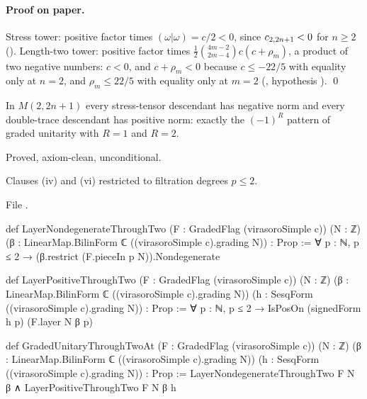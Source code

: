 \paragraph{Proof on paper.} Stress tower: positive factor times $(\omega|\omega) = c/2<0$, since
$c_{2,2n+1}<0$ for $n\ge2$ (\allowbreak{}). Length-two tower: positive factor
times $\tfrac12\binom{4m-2}{2m-4}c(c+\rho_m)$, a product of two negative numbers: $c<0$, and
$c+\rho_m<0$ because $c\le-22/5$ with equality only at $n=2$, and $\rho_m\le22/5$ with equality only at
$m=2$ (\allowbreak{}, hypothesis ). \qed

\begin{physics}
In $M(2,2n+1)$ every stress-tensor descendant has negative norm and every double-trace descendant has
positive norm: exactly the $(-1)^R$ pattern of graded unitarity with $R = 1$ and $R=2$.
\end{physics}

\begin{status}
Proved, axiom-clean, unconditional.
\end{status}

\begin{definition}\label{l19:def:throughtwo}
Clauses (iv) and (vi) restricted to filtration degrees $p\le2$.
\end{definition}

\noindent File .
\begin{leancode}
def LayerNondegenerateThroughTwo (F : GradedFlag (virasoroSimple c)) (N : ℤ)
    (β : LinearMap.BilinForm ℂ ((virasoroSimple c).grading N)) : Prop :=
  ∀ p : ℕ, p ≤ 2 → (β.restrict (F.pieceIn p N)).Nondegenerate

def LayerPositiveThroughTwo (F : GradedFlag (virasoroSimple c)) (N : ℤ)
    (β : LinearMap.BilinForm ℂ ((virasoroSimple c).grading N))
    (h : SesqForm ((virasoroSimple c).grading N)) : Prop :=
  ∀ p : ℕ, p ≤ 2 → IsPosOn (signedForm h p) (F.layer N β p)

def GradedUnitaryThroughTwoAt (F : GradedFlag (virasoroSimple c)) (N : ℤ)
    (β : LinearMap.BilinForm ℂ ((virasoroSimple c).grading N))
    (h : SesqForm ((virasoroSimple c).grading N)) : Prop :=
  LayerNondegenerateThroughTwo F N β ∧ LayerPositiveThroughTwo F N β h
\end{leancode}

